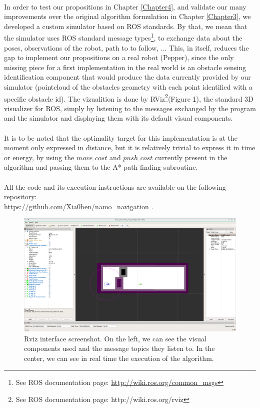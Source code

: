 \paragraph{} In order to test our propositions in Chapter \ref{Chapter4}, and validate our many improvements over the original algorithm formulation in Chapter \ref{Chapter3}, we developed a custom simulator based on ROS standards. By that, we mean that the simulator uses ROS standard message types\footnote{See ROS documentation page: \url{http://wiki.ros.org/common_msgs}}, to exchange data about the poses, observations of the robot, path to to follow, ... This, in itself, reduces the gap to implement our propositions on a real robot (Pepper), since the only missing piece for a first implementation in the real world is an obstacle sensing identification component that would produce the data currently provided by our simulator (pointcloud of the obstacles geometry with each point identified with a specific obstacle id). The vizualition is done by RViz\footnote{See ROS documentation page: http://wiki.ros.org/rviz}(Figure \ref{fig:rviz}), the standard 3D visualizer for ROS, simply by listening to the messages exchanged by the program and the simulator and displaying them with its default visual components.

\paragraph{} It is to be noted that the optimality target for this implementation is at the moment only expressed in distance, but it is relatively trivial to express it in time or energy, by using the $move\_cost$ and $push\_cost$ currently present in the algorithm and passing them to the A* path finding subroutine.

\paragraph{} All the code and its execution instructions are available on the following repository: \\ \url{https://github.com/Xia0ben/namo_navigation} .

\begin{figure}[H]
\centering
\includegraphics[width=14cm]{Figures/Simulation/rviz.png}
\caption{Rviz interface screenshot. On the left, we can see the visual components used and the message topics they listen to. In the center, we can see in real time the execution of the algorithm.}
\label{fig:rviz}
\end{figure}

